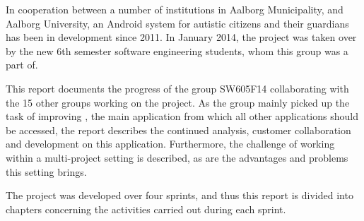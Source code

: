 In cooperation between a number of institutions in Aalborg Municipality, and Aalborg University, an Android system for autistic citizens and their guardians has been in development since 2011.
In January 2014, the project was taken over by the new 6th semester software engineering students, whom this group was a part of.

This report documents the progress of the group SW605F14 collaborating with the 15 other groups working on the project.
As the group mainly picked up the task of improving \launcher, the main application from which all other applications should be accessed, the report describes the continued analysis, customer collaboration and development on this application.
Furthermore, the challenge of working within a multi-project setting is described, as are the advantages and problems this setting brings.

The project was developed over four sprints, and thus this report is divided into chapters concerning the activities carried out during each sprint.